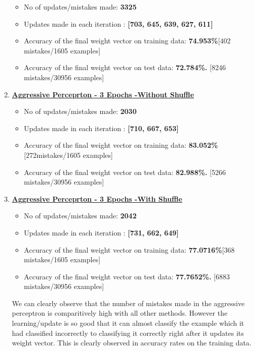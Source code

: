 \documentclass[12pt, fullpage,letterpaper]{article}
\begin{document}
\begin{enumerate}
	\begin{itemize}
		\item No of updates/mistakes made: \textbf{3325} 
		\item Updates made in each iteration :\textbf{ [703, 645, 639, 627, 611] } 
		\item Accuracy of the final weight vector on training data: \textbf{74.953\%}[402 mistakes/1605 examples]
		\item Accuracy of the final weight vector on test data: \textbf{72.784\%.} [8246 mistakes/30956 examples]
	\end{itemize}
	
	
	\item[] \textbf {\underline{ Aggressive Perceprton - 3 Epochs -Without Shuffle }}
	
	\begin{itemize}
		\item No of updates/mistakes made: \textbf{2030} 
		\item Updates made in each iteration :\textbf{ [710, 667, 653] } 
		\item Accuracy of the final weight vector on training data: \textbf{83.052\%}[272mistakes/1605 examples]
		\item Accuracy of the final weight vector on test data: \textbf{82.988\%.} [5266 mistakes/30956 examples]
	\end{itemize}
	

	\item[] \textbf {\underline{ Aggressive Perceprton - 3 Epochs -With Shuffle }}
	
	\begin{itemize}
		\item No of updates/mistakes made: \textbf{2042} 
		\item Updates made in each iteration :\textbf{ [731, 662, 649] } 
		\item Accuracy of the final weight vector on training data: \textbf{77.0716\%}[368 mistakes/1605 examples]
		\item Accuracy of the final weight vector on test data: \textbf{77.7652\%.} [6883 mistakes/30956 examples]
	\end{itemize}
	
	We can clearly observe that the number of mistakes made in the aggressive perceptron is comparitively high with all other methods. However the learning/update is so good that it can almost classify the example which it had classified incorrectly to classifying it correctly right after it updates its weight vector.
	This is clearly observed in accuracy rates on the training data.
	

\end{enumerate}
\end{document}
